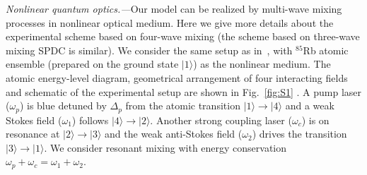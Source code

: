\documentclass[twocolumn,prl,floatfix,citeautoscript,nofootinbib,superscriptaddress]{revtex4}
\begin{document}
\begin{widetext}
\emph{{\color{blue}Nonlinear quantum optics}.---}Our model can be realized
by multi-wave mixing processes in nonlinear optical medium. Here we give
more details about the experimental scheme based on four-wave mixing (the
scheme based on three-wave mixing SPDC is similar). We consider the same
setup as in~\cite{PhysRevLett.123.193604S}, with $^{85}$Rb atomic ensemble
(prepared on the ground state $|1\rangle $) as the nonlinear medium. The
atomic energy-level diagram, geometrical arrangement of four interacting
fields and schematic of the experimental setup are shown in Fig.~\ref{fig:S1}%
. A pump laser ($\omega _{p}$) is blue detuned by $\Delta _{p}$ from the
atomic transition $|1\rangle \rightarrow |4\rangle $ and a weak Stokes field
($\omega _{1}$) follows $|4\rangle \rightarrow |2\rangle $. Another strong
coupling laser ($\omega _{c}$) is on resonance at $|2\rangle \rightarrow
|3\rangle $ and the weak anti-Stokes field ($\omega _{2}$) drives the
transition $|3\rangle \rightarrow |1\rangle $. We consider resonant mixing
with energy conservation $\omega _{p}+\omega _{c}=\omega _{1}+\omega _{2}$.


\end{widetext}
\end{document}
